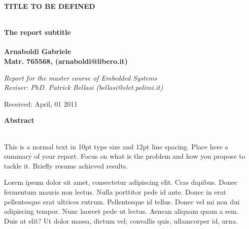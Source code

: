 \documentclass[a4paper,10pt]{article}
\newenvironment*{mytitle}{\begin{LARGE}\bf}{\end{LARGE}\\}%
\newenvironment*{mysubtitle}{\bf}{\\[1.5ex]}%
\newenvironment*{myabstract}{\begin{Large}\bf}{\end{Large}\\[2.5ex]}%
\begin{document}
\nocite{*}
\begin{mytitle}TITLE TO BE DEFINED\end{mytitle}
\begin{mysubtitle}The report subtitle\end{mysubtitle}
%
%
\\
Arnaboldi Gabriele\\
Matr. 765568, (arnaboldi@libero.it)\\
\hspace{10ex}
\begin{flushright}
\emph{Report for the master course of Embedded Systems}\\
\emph{Reviser: PhD. Patrick Bellasi (bellasi@elet.polimi.it)}
\end{flushright}

Received: April, 01 2011\\
\hspace{10ex}

\begin{myabstract} Abstract \end{myabstract}
This is a normal text in 10pt type size and 12pt line spacing.
Place here a summary of your report. Focus on what is the problem and how you
propose to tackle it. Briefly resume achieved results.

Lorem ipsum dolor sit amet, consectetur adipiscing elit. Cras dapibus. Donec
fermentum mauris non lectus. Nulla porttitor pede id ante. Donec in erat
pellentesque erat ultrices rutrum. Pellentesque id tellus. Donec vel mi non dui
adipiscing tempor.  Nunc laoreet pede ut lectus. Aenean aliquam quam a sem. Duis
at elit? Ut dolor massa, dictum vel; convallis quis, ullamcorper id, urna.

\vspace{4ex}	%
\begin{multicols}{2}





\end{multicols}

\begin{multicols}{2}





\end{multicols}
\end{document}
